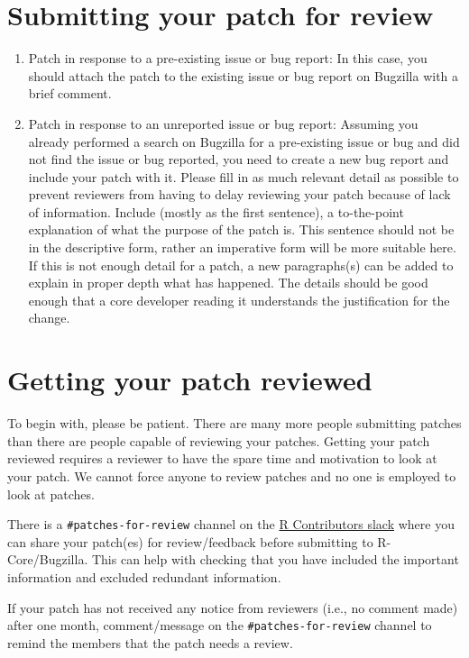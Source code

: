 \documentclass[
]{book}
\begin{document}
\section{Submitting your patch for review}\label{SubmitPatches}

\begin{enumerate}
\def\labelenumi{\arabic{enumi}.}
\item
  Patch in response to a pre-existing issue or bug report: In this case, you should attach the patch to the existing issue or bug report on Bugzilla with a brief comment.
\item
  Patch in response to an unreported issue or bug report: Assuming you already performed a search on Bugzilla for a pre-existing issue or bug and did not find the issue or bug reported, you need to create a new bug report and include your patch with it. Please fill in as much relevant detail as possible to prevent reviewers from having to delay reviewing your patch because of lack of information. Include (mostly as the first sentence), a to-the-point explanation of what the purpose of the patch is. This sentence should not be in the descriptive form, rather an imperative form will be more suitable here. If this is not enough detail for a patch, a new paragraphs(s) can be added to explain in proper depth what has happened. The details should be good enough that a core developer reading it understands the justification for the change.
\end{enumerate}

\section{Getting your patch reviewed}\label{PatchesReview}

To begin with, please be patient. There are many more people submitting patches than there are people capable of reviewing your patches. Getting your patch reviewed requires a reviewer to have the spare time and motivation to look at your patch. We cannot force anyone to review patches and no one is employed to look at patches.

There is a \texttt{\#patches-for-review} channel on the \href{https://r-contributors.slack.com/}{R Contributors slack} where you can share your patch(es) for review/feedback before submitting to R-Core/Bugzilla. This can help with checking that you have included the important information and excluded redundant information.

If your patch has not received any notice from reviewers (i.e., no comment made) after one month, comment/message on the \texttt{\#patches-for-review} channel to remind the members that the patch needs a review.
\end{document}
